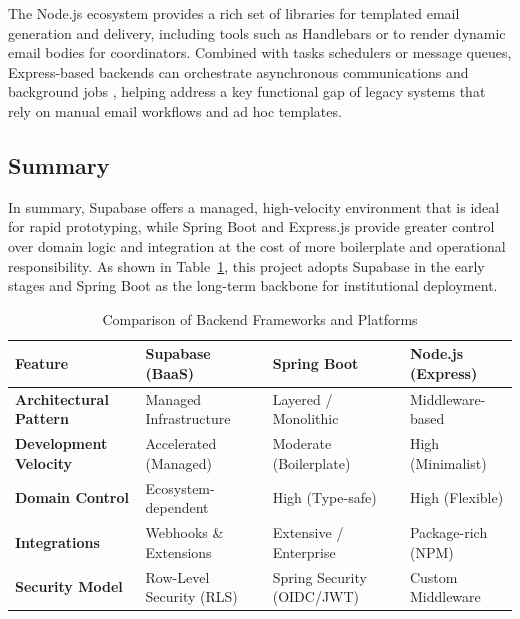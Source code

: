         {
            The Node.js ecosystem provides a rich set of libraries for templated email generation and delivery, including tools such as Handlebars or  to render dynamic 
             email bodies \cite{handlebars-js, ejs-js} for coordinators. Combined with tasks schedulers or message queues, Express-based backends can orchestrate asynchronous 
            communications and background jobs \cite{node-js}, helping address a key functional gap of legacy systems that rely on manual email workflows and ad hoc templates.
        }
    
    \subsection*{Summary}

        {
            In summary, Supabase offers a managed, high-velocity environment that is ideal for rapid prototyping, while 
            Spring Boot and Express.js provide greater control over domain logic and integration at the cost of more boilerplate and operational
            responsibility.
            As shown in Table~\ref{tab:backend_framework_comparison}, this project adopts Supabase in the early stages and 
            Spring Boot as the long-term backbone for institutional deployment.
            
        }
        \begin{table}[H]
            \centering
            \renewcommand{\arraystretch}{1.5} 
            \begin{tabularx}{\textwidth}{|l|>{\raggedright\arraybackslash}X|>{\raggedright\arraybackslash}X|>{\raggedright\arraybackslash}X|}
                \hline
                \textbf{Feature} & \textbf{Supabase (BaaS)} & \textbf{Spring Boot} & \textbf{Node.js (Express)} \\ \hline
                \textbf{Architectural Pattern} & Managed Infrastructure & Layered / Monolithic & Middleware-based \\ \hline
                \textbf{Development Velocity} & Accelerated (Managed) & Moderate (Boilerplate) & High (Minimalist) \\ \hline
                \textbf{Domain Control} & Ecosystem-dependent & High (Type-safe) & High (Flexible) \\ \hline
                \textbf{Integrations} & Webhooks \& Extensions & Extensive / Enterprise & Package-rich (NPM) \\ \hline
                \textbf{Security Model} & Row-Level Security (RLS) & Spring Security (OIDC/JWT) & Custom Middleware \\ \hline
            \end{tabularx}
            \caption{Comparison of Backend Frameworks and Platforms}
            \label{tab:backend_framework_comparison}
        \end{table}

